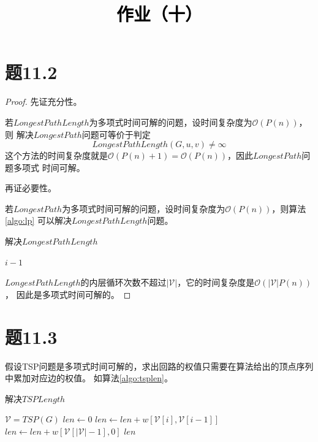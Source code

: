 \documentclass[a4paper,twoside]{article}
\newcommand{\PaperTitle}{作业（十）}  %
\begin{document}
\newpage

\title{
	\Large{\textcolor{black}{\PaperTitle}}
}
	
	
\maketitle
	
\tableofcontents
 
\newpage
\setcounter{page}{1}

\begin{spacing}{1.2}

\section{题11.2}

\begin{proof}
	先证充分性。

	若$LongestPathLength$为多项式时间可解的问题，设时间复杂度为$\mathcal{O}(P(n))$，则
	解决$LongestPath$问题可等价于判定
	\[
		LongestPathLength(G,u,v) \ne \infty
	\]
	这个方法的时间复杂度就是$\mathcal{O}(P(n)+1)=\mathcal{O}(P(n))$，因此$LongestPath$问题多项式
	时间可解。

	再证必要性。

	若$LongestPath$为多项式时间可解的问题，设时间复杂度为$\mathcal{O}(P(n))$，则算法\ref{algo:lp}
	可以解决$LongestPathLength$问题。
	\begin{algorithm}[htbp]
		\caption{解决$LongestPathLength$}
		\label{algo:lp}
		\begin{algorithmic}[1]
						\State \Return $i-1$
					\EndIf
				\EndFor
			\EndProcedure
		\end{algorithmic}
	\end{algorithm}	

	$LongestPathLength$的内层循环次数不超过$|\mathcal{V}|$，它的时间复杂度是$\mathcal{O}(|\mathcal{V}|P(n))$，
	因此是多项式时间可解的。

\end{proof}

\section{题11.3}

假设TSP问题是多项式时间可解的，求出回路的权值只需要在算法给出的顶点序列中累加对应边的权值。
如算法\ref{algo:tsplen}。

\begin{algorithm}[htbp]
	\caption{解决$TSPLength$}
	\label{algo:tsplen}
	\begin{algorithmic}[1]
			\State $\mathcal{V}=TSP(G)$
			\State $len\gets 0$
				\State $len \gets len+w[\mathcal{V}[i],\mathcal{V}[i-1]]$
			\EndFor
			\State $len\gets len+w[\mathcal{V}[|\mathcal{V}|-1],0]$
			\State \Return $len$
		\EndProcedure
	\end{algorithmic}
\end{algorithm}	


\end{spacing}
\end{document}
